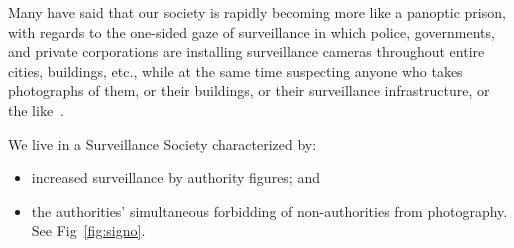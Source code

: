 Many have said that our society is rapidly becoming more like a
panoptic\cite{foucault} prison, with regards to the one-sided gaze of surveillance in which police,
governments, and private corporations are installing surveillance cameras
throughout entire cities, buildings, etc., while at the same time suspecting
anyone who takes photographs of them, or their buildings, or their
surveillance infrastructure, or the like~\cite{gandy1989surveillance}.


We live in a Surveillance Society\cite{lyon2001surveillance}
characterized by:
\begin{itemize}
 \item increased surveillance by authority figures; and
 \item the authorities' simultaneous forbidding of non-authorities from
       photography.
       See Fig~\ref{fig:signo}.
\end{itemize}


